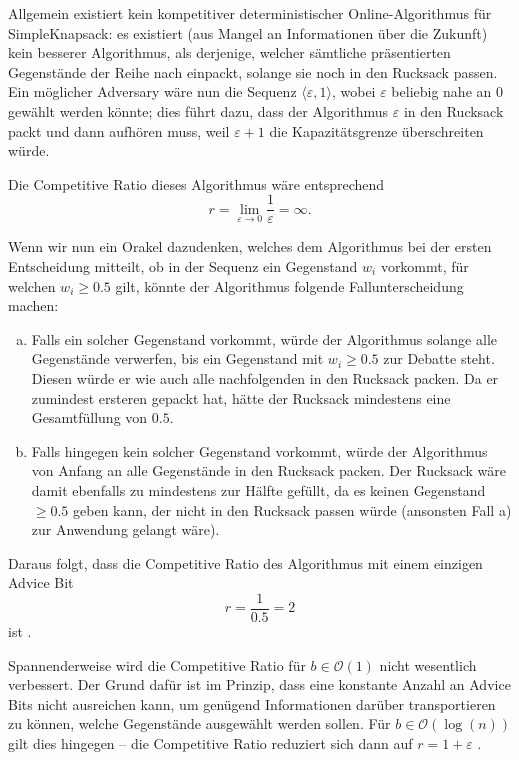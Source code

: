 \documentclass[11pt,abstracton]{scrreprt} %
\theoremstyle{definition}
\begin{document}
\bigskip
Allgemein existiert kein kompetitiver deterministischer Online-Algorithmus \cite{spaccamela} für {\sc SimpleKnapsack}: es existiert (aus Mangel an Informationen über die Zukunft) kein besserer Algorithmus, als derjenige, welcher sämtliche präsentierten Gegenstände der Reihe nach einpackt, solange sie noch in den Rucksack passen. Ein möglicher Adversary wäre nun die Sequenz $\langle \varepsilon, 1 \rangle$, wobei $\varepsilon$ beliebig nahe an $0$ gewählt werden könnte; dies führt dazu, dass der Algorithmus $\varepsilon$ in den Rucksack packt und dann aufhören muss, weil $\varepsilon + 1$ die Kapazitätsgrenze überschreiten würde.

Die Competitive Ratio dieses Algorithmus wäre entsprechend
\[
	r = \lim_{\varepsilon \rightarrow 0} \frac {1} { \varepsilon} = \infty.
\]

Wenn wir nun ein Orakel dazudenken, welches dem Algorithmus bei der ersten Entscheidung mitteilt, ob in der Sequenz ein Gegenstand $w_i$ vorkommt, für welchen $w_i \ge 0.5$ gilt, könnte der Algorithmus folgende Fallunterscheidung machen:

\begin{enumerate}[a)]
\item Falls ein solcher Gegenstand vorkommt, würde der Algorithmus solange alle Gegenstände verwerfen, bis ein Gegenstand mit $w_i \ge 0.5$ zur Debatte steht. Diesen würde er wie auch alle nachfolgenden in den Rucksack packen. Da er zumindest ersteren gepackt hat, hätte der Rucksack mindestens eine Gesamtfüllung von $0.5$.
\item Falls hingegen kein solcher Gegenstand vorkommt, würde der Algorithmus von Anfang an alle Gegenstände in den Rucksack packen. Der Rucksack wäre damit ebenfalls zu mindestens zur Hälfte gefüllt, da es keinen Gegenstand $\ge 0.5$ geben kann, der nicht in den Rucksack passen würde (ansonsten Fall a) zur Anwendung gelangt wäre).
\end{enumerate}

Daraus folgt, dass die Competitive Ratio des Algorithmus mit einem einzigen Advice Bit
\[
	r = \frac 1 {0.5} = 2
\]
ist \cite{knapsack}.

\bigskip
Spannenderweise wird die Competitive Ratio für $b \in \mathcal{O}(1)$ nicht wesentlich verbessert. Der Grund dafür ist im Prinzip, dass eine konstante Anzahl an Advice Bits nicht ausreichen kann, um genügend Informationen darüber transportieren zu können, welche Gegenstände ausgewählt werden sollen. Für $b \in \mathcal{O}(\log(n))$ gilt dies hingegen -- die Competitive Ratio reduziert sich dann auf $r = 1 + \varepsilon$ \cite{knapsack}.
\end{document}
